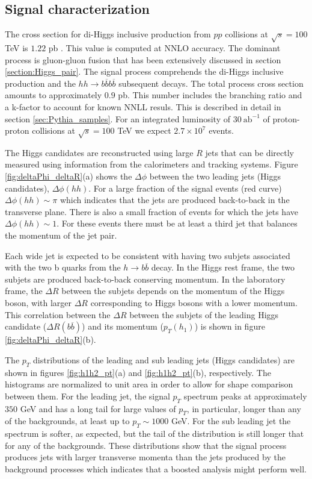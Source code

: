 \subsection{Signal characterization}

The cross section for di-Higgs inclusive production from $pp$ collisions at $\sqrt{s}=100$ TeV is $1.22$ pb \cite{HxsNNLO}. This value is computed at NNLO accuracy. The dominant process is gluon-gluon fusion that has been extensively discussed in section \ref{section:Higgs_pair}. The signal process comprehends the di-Higgs inclusive production and the $hh\rightarrow b\overline{b}b\overline{b}$ subsequent decays. The total process cross section amounts to approximately $0.9$ pb. This number includes the branching ratio and a k-factor to account for known NNLL resuls. This is described in detail in section \ref{sec:Pythia_samples}. For an integrated luminosity of $30~\text{ab}^{-1}$ of proton-proton collisions at $\sqrt{s}=100$ TeV we expect $2.7\times 10^{7}$ events.

The Higgs candidates are reconstructed using large $R$ jets that can be directly measured using information from the calorimeters and tracking systems. Figure \ref{fig:deltaPhi_deltaR}(a) shows the $\Delta\phi$ between the two leading jets (Higgs candidates), $\Delta\phi(hh)$. For a large fraction of the signal events (red curve) $\Delta\phi(hh)\sim \pi$ which indicates that the jets are produced back-to-back in the transverse plane. There is also a small fraction of events for which the jets have $\Delta\phi(hh)\sim 1$. For these events there must be at least a third jet that balances the momentum of the jet pair. 

Each wide jet is expected to be consistent with having two subjets associated with the two b quarks from the $h\rightarrow b\overline{b}$ decay. In the Higgs rest frame, the two subjets are produced back-to-back conserving momentum. In the laboratory frame, the $\Delta R$ between the subjets depends on the momentum of the Higgs boson, with larger $\Delta R$ corresponding to Higgs bosons with a lower momentum. This correlation between the $\Delta R$ between the subjets of the leading Higgs candidate ($\Delta R(b\overline{b})$) and its momentum ($p_T(h_1)$) is shown in figure \ref{fig:deltaPhi_deltaR}(b). 

The $p_T$ distributions of the leading and sub leading jets (Higgs candidates) are shown in figures \ref{fig:h1h2_pt}(a) and \ref{fig:h1h2_pt}(b), respectively. The histograms are normalized to unit area in order to allow for shape comparison between them. For the leading jet, the signal $p_T$ spectrum peaks at approximately $350$ GeV and has a long tail for large values of $p_T$, in particular, longer than any of the backgrounds, at least up to $p_T\sim1000$ GeV. For the sub leading jet the spectrum is softer, as expected, but the tail of the distribution is still longer that for any of the backgrounds. These distributions show that the signal process produces jets with larger transverse momenta than the jets produced by the background processes which indicates that a boosted analysis might perform well.

